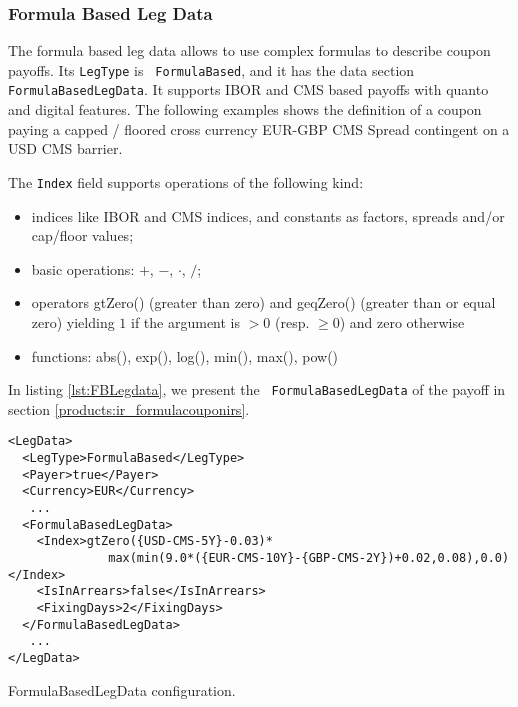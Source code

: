 \subsubsection{Formula Based Leg Data}
\label{ss:formulalegdata}

The formula based leg data allows to use complex formulas to describe coupon payoffs. Its {\tt LegType} is {\tt
  FormulaBased}, and it has the data section {\tt FormulaBasedLegData}. It supports IBOR and CMS based payoffs with
quanto and digital features. The following examples shows the definition of a coupon paying a capped / floored cross
currency EUR-GBP CMS Spread contingent on a USD CMS barrier.

The {\tt Index} field supports operations of the following kind:
\begin{itemize}
\item indices like IBOR and CMS indices, and constants as factors,
  spreads and/or cap/floor values;
\item basic operations: $+$, $-$, $\cdot$, $/$;
\item operators gtZero() (greater than zero) and geqZero() (greater than or equal zero) yielding $1$ if the argument is
  $>0$ (resp. $\geq 0$) and zero otherwise
\item functions: abs(), exp(), log(), min(), max(), pow()
\end{itemize}
%
In listing \ref{lst:FBLegdata}, we present the {\tt
  FormulaBasedLegData} of the payoff in section \ref{products:ir_formulacouponirs}.
%
\begin{listing}
\begin{verbatim}
<LegData>
  <LegType>FormulaBased</LegType>
  <Payer>true</Payer>
  <Currency>EUR</Currency>
   ...
  <FormulaBasedLegData>
    <Index>gtZero({USD-CMS-5Y}-0.03)*
              max(min(9.0*({EUR-CMS-10Y}-{GBP-CMS-2Y})+0.02,0.08),0.0)</Index>
    <IsInArrears>false</IsInArrears>
    <FixingDays>2</FixingDays>
  </FormulaBasedLegData>
   ...
</LegData>
\end{verbatim}
\caption{FormulaBasedLegData configuration.}
\label{lst:FBLegdata}
\end{listing}
